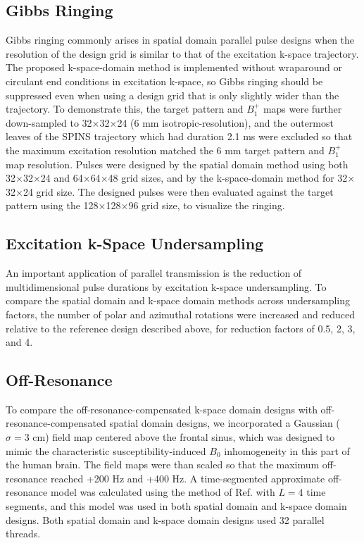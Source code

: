\subsection*{Gibbs Ringing}
Gibbs ringing commonly arises in spatial domain parallel pulse designs when the resolution of the 
design grid is similar to that of the excitation k-space trajectory. 
The proposed k-space-domain method is implemented without wraparound or circulant end conditions in excitation k-space, 
so Gibbs ringing should be suppressed even when using a design grid that is only slightly wider than the trajectory. 
To demonstrate this, 
the target pattern and $B_1^+$ maps were further down-sampled to 32$\times$32$\times$24 (6 mm isotropic-resolution),
and the outermost leaves of the SPINS trajectory which had duration 2.1 ms were excluded so that the maximum excitation 
resolution matched the 6 mm target pattern and $B_1^+$ map resolution. 
Pulses were designed by the spatial domain method using both 32$\times$32$\times$24 and 64$\times$64$\times$48 grid sizes,
and by the k-space-domain method for 32$\times$32$\times$24 grid size.
The designed pulses were then evaluated against the target pattern using the 128$\times$128$\times$96 grid size,
to visualize the ringing.

\subsection*{Excitation k-Space Undersampling}
An important application of parallel transmission is the reduction of multidimensional pulse durations by excitation k-space undersampling.
To compare the spatial domain and k-space domain methods across undersampling factors,
the number of polar and azimuthal rotations were increased and reduced relative to the reference design described above, 
for reduction factors of 0.5, 2, 3, and 4. 

\subsection*{Off-Resonance}
To compare the off-resonance-compensated k-space domain designs with off-resonance-compensated spatial domain designs,
we incorporated a Gaussian ($\sigma = 3$ cm) field map centered above the frontal sinus, 
which was designed to mimic the characteristic susceptibility-induced $B_0$ inhomogeneity in this part of the human brain. 
The field maps were than scaled so that the maximum off-resonance reached +200 Hz and +400 Hz.
A time-segmented approximate off-resonance model was calculated using the method of Ref. \cite{fessler2005toeplitz} with $L = 4$ time segments,
and this model was used in both spatial domain and k-space domain designs. 
Both spatial domain and k-space domain designs used 32 parallel threads. 


